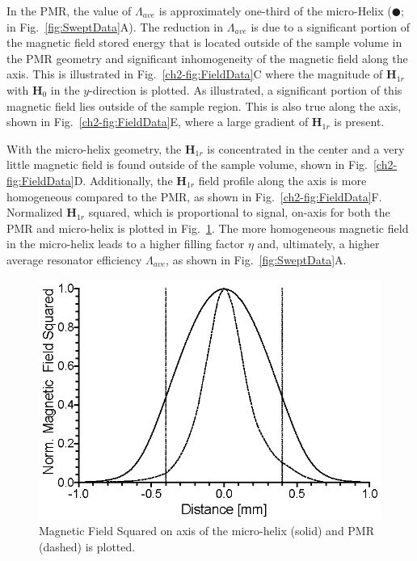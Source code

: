 In the PMR, the value of $\Lambda_{ave}$ is approximately one-third of the micro-Helix ($\CIRCLE$; in Fig.~\ref{fig:SweptData}A). The reduction in $\Lambda_{ave}$ is due to a significant portion of the magnetic field stored energy that is located outside of the sample volume in the PMR geometry and significant inhomogeneity of the magnetic field along the axis. This is illustrated in Fig.~\ref{ch2-fig:FieldData}C where the magnitude of $\mathbf{H}_{1r}$ with $\mathbf{H}_0$ in the $y$-direction is plotted. As illustrated, a significant portion of this magnetic field lies outside of the sample region. This is also true along the axis, shown in Fig.~\ref{ch2-fig:FieldData}E, where a large gradient of $\mathbf{H}_{1r}$ is present. 

With the micro-helix geometry, the $\mathbf{H}_{1r}$ is concentrated in the center and a very little magnetic field is found outside of the sample volume, shown in Fig.~\ref{ch2-fig:FieldData}D. Additionally, the $\mathbf{H}_{1r}$ field profile along the axis is more homogeneous compared to the PMR, as shown in  Fig.~\ref{ch2-fig:FieldData}F. Normalized $\mathbf{H}_{1r}$ squared, which is proportional to signal, on-axis for both the PMR and micro-helix is plotted in Fig.~\ref{fig:HFSS}.  The more homogeneous magnetic field in the micro-helix leads to a higher filling factor $\eta$ and, ultimately, a higher average resonator efficiency $\Lambda_{ave}$, as shown in Fig.~\ref{fig:SweptData}A. 

\begin{figure}[ht]
 \centering
 \includegraphics{Kapitel/Ch5-Images/B2OnAxis.eps}
 \caption[Magnetic Field Squared on axis: PMR vs micro-Helix.]{Magnetic Field Squared on axis of the micro-helix (solid) and PMR  (dashed) is plotted.}
 \label{fig:HFSS}
\end{figure}

